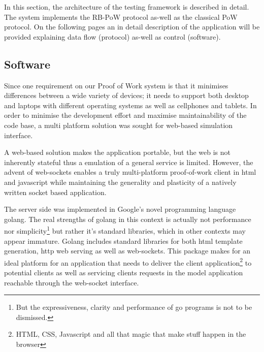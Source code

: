 In this section, the architecture of the testing framework is described in detail. The system implements the RB-PoW protocol as-well as the classical PoW protocol. On the following pages an in detail description of the application will be provided explaining data flow (protocol) as-well as control (software).

\subsection{Software}
Since one requirement on our Proof of Work system is that it minimises differences between a wide variety of devices; it needs to support both desktop and laptops with different operating systems as well as cellphones and tablets.
In order to minimise the development effort and maximise maintainability of the code base, a multi platform solution was sought for web-based simulation interface. 

A web-based solution makes the application portable, but the web is not inherently stateful thus a emulation of a general service is limited. However, the advent of web-sockets enables a truly multi-platform proof-of-work client in html and javascript while maintaining the generality and plasticity of a natively written socket based application. 
\begin{comment}
The javascript implementation for handling the protocol is quite simple:
\jscode[firstline=57, firstnumber=57, lastline=84]{../pow.js}
The solution finding part also need to be presented:
\jscode[firstline=26, firstnumber=26, lastline=49]{../pow.js}
To trigger a request to be sent to the server we build the following function which is then registered to the onclick event of a button in the web gui:
\jscode[firstline=100, firstnumber=100, lastline=105]{../pow.js}
\end{comment}

The server side was implemented in Google's novel programming language golang\cite{golang}. The real strengths of golang in this context is actually not performance nor simplicity\footnote{But the expressiveness, clarity and performance of go programs is not to be dismissed.} but rather it's standard libraries, which in other contexts may appear immature. Golang includes standard libraries for both html template generation, http web serving as well as web-sockets. This package makes for an ideal platform for an application that needs to deliver the client application\footnote{HTML, CSS, Javascript and all that magic that make stuff happen in the browser} to potential clients as well as servicing clients requests in the model application reachable through the web-socket interface. 

